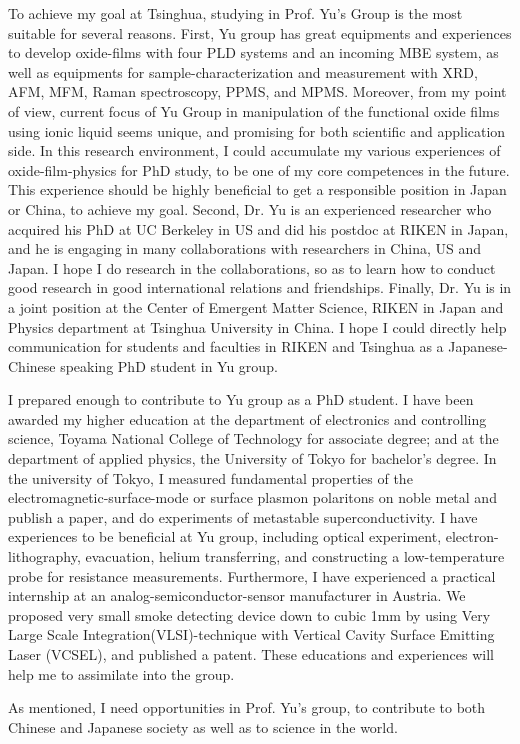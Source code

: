 \documentclass[aps,prb,reprint]{revtex4-1}
\begin{document}
To achieve my goal at Tsinghua, studying in Prof. Yu's Group is the most suitable for several reasons. First, Yu group has great equipments and experiences to develop oxide-films with four PLD systems and an incoming MBE system, as well as equipments for sample-characterization and measurement with XRD, AFM, MFM, Raman spectroscopy, PPMS, and MPMS. Moreover, from my point of view, current focus of Yu Group in manipulation of the functional oxide films using ionic liquid seems unique, and promising for both scientific and application side. In this research environment, I could accumulate my various experiences of oxide-film-physics for PhD study, to be one of my core competences in the future. This experience should be highly beneficial to get a responsible position in Japan or China, to achieve my goal. Second, Dr. Yu is an experienced researcher who acquired his PhD at UC Berkeley in US and did his postdoc at RIKEN in Japan, and he is engaging in many collaborations with researchers in China, US and Japan. I hope I do research in the collaborations, so as to learn how to conduct good research in good international relations and friendships. Finally, Dr. Yu is in a joint position at the Center of Emergent Matter Science, RIKEN in Japan and Physics department at Tsinghua University in China. I hope I could directly help communication for students and faculties in RIKEN and Tsinghua as a Japanese-Chinese speaking PhD student in Yu group.

I prepared enough to contribute to Yu group as a PhD student. I have been awarded my higher education at the department of electronics and controlling science, Toyama National College of Technology for associate degree; and at the department of applied physics, the University of Tokyo for bachelor's degree.  In the university of Tokyo, I measured fundamental properties of the electromagnetic-surface-mode or surface plasmon polaritons on noble metal and publish a paper\cite{paper}, and do experiments of metastable superconductivity. I have experiences to be beneficial at Yu group, including optical experiment, electron-lithography, evacuation, helium transferring, and constructing a low-temperature probe for resistance measurements. Furthermore, I have experienced a practical internship at an analog-semiconductor-sensor manufacturer in Austria. We proposed very small smoke detecting device down to cubic 1mm by using Very Large Scale Integration(VLSI)-technique with Vertical Cavity Surface Emitting Laser (VCSEL), and published a patent\cite{patent}. These educations and experiences will help me to assimilate into the group.

As mentioned, I need opportunities in Prof. Yu's group, to contribute to both Chinese and Japanese society as well as to science in the world.


\end{document}
